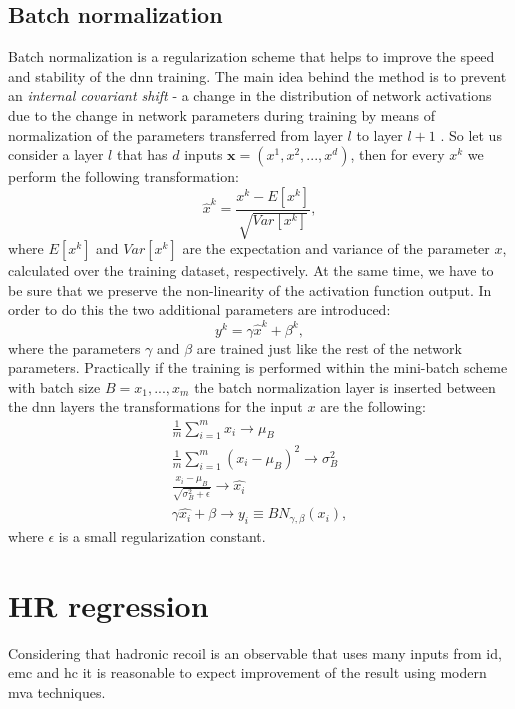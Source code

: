 \subsection{Batch normalization}
Batch normalization is a regularization scheme that helps to improve the speed and stability of the \gls{dnn} training. The main idea behind the method is to prevent an \textit{internal covariant shift} - a change in the distribution of network activations due to the change in network parameters during training by means of normalization of the parameters transferred from layer $l$ to layer $l+1$  \cite{batch_normalization}. So let us consider a layer $l$ that has $d$ inputs $\textbf{x}=(x^1,x^2,...,x^d)$, then for every $x^k$ we perform the following transformation:
\begin{equation}
\label{eq::bn1}
\hat{x}^k=\frac{x^k-E[x^k]}{\sqrt{Var[x^k]}},
\end{equation}
where $E[x^k]$ and $Var[x^k]$ are the expectation and variance of the parameter $x$, calculated over the training dataset, respectively. At the same time, we have to be sure that we preserve the non-linearity of the activation function output. In order to do this the two additional parameters are introduced:
\begin{equation}
\label{eq::bn2}
y^k=\gamma  \hat{x}^k + \beta^k ,
\end{equation}
where the parameters $\gamma$ and $\beta$ are trained just like the rest of the network parameters.
Practically if the training is performed within the mini-batch scheme with batch size $B={x_1,...,x_m}$ the batch normalization layer is inserted between the \gls{dnn} layers the transformations for the input $x$ are the following:
\begin{equation}
\begin{array}{lcl} 
\frac{1}{m}\sum_{i=1}^m x_i \rightarrow \mu_B\\
\frac{1}{m}\sum_{i=1}^m (x_i - \mu_B)^2 \rightarrow \sigma^2_B\\
\frac {x_i-\mu_B}{\sqrt{\sigma_B^2+\epsilon}} \rightarrow \hat{x_i}\\
\gamma \hat{x_i} + \beta \rightarrow y_i \equiv BN_{\gamma,\beta}(x_i),
\end{array}
\end{equation}
where $\epsilon$ is a small regularization constant. 
\section{HR regression}
Considering that hadronic recoil is an observable that uses many inputs from \gls{id}, \gls{emc} and \gls{hc} it is reasonable to expect improvement of the result using modern \gls{mva} techniques. 
